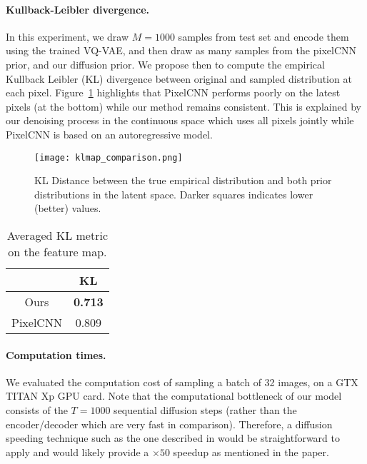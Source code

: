 \documentclass{article}
\theoremstyle{plain}
\theoremstyle{definition}
\theoremstyle{remark}
\begin{document}
\paragraph{Kullback-Leibler divergence. }
In this experiment,  we draw $M=1000$ samples from test set and encode them using the trained VQ-VAE, and then draw as many samples from the pixelCNN prior, and our diffusion prior. We propose then to compute the empirical Kullback Leibler (KL) divergence between original and sampled distribution at each pixel. Figure~\ref{fig:klmap} highlights that PixelCNN performs poorly on the latest pixels (at the bottom) while our method remains consistent. This is explained by our denoising process in the continuous space which uses all pixels jointly while  PixelCNN is based on an autoregressive model. 
\begin{figure}[htpb]
    \centering
    \texttt{[image: klmap\_comparison.png]}
    \caption{KL Distance between the true empirical distribution and both prior distributions in the latent space. Darker squares indicates lower (better) values.}
    \label{fig:klmap}
    \vspace{-2mm}
\end{figure}

\begin{table}[htpb]
    \centering
    \begin{tabular}{c c}
        \toprule
         & KL \\
        \toprule
        Ours & {\bf 0.713}\\
        PixelCNN & 0.809 \\
        \bottomrule
    \end{tabular}
    \caption{Averaged KL metric on the feature map.}
    \label{tab:metrics}
    \vspace{-4mm}
\end{table}

\paragraph{Computation times. }
We evaluated the computation cost of sampling a batch of 32 images, on a GTX TITAN Xp GPU card. Note that the computational bottleneck of our model consists of the $T=1000$ sequential diffusion steps (rather than the encoder/decoder which are very fast in comparison). Therefore, a diffusion speeding technique such as the one described in \cite{song2021denoising} would be straightforward to apply and would likely provide a $\times 50$ speedup as mentioned in the paper.
\end{document}
